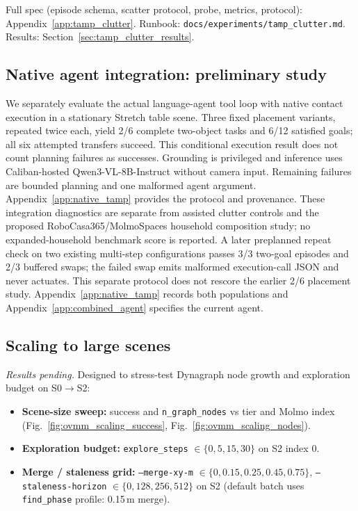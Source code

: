 Full spec (episode schema, scatter protocol, probe, metrics, protocol): Appendix~\ref{app:tamp_clutter}.
Runbook: \texttt{docs/experiments/tamp\_clutter.md}. Results: Section~\ref{sec:tamp_clutter_results}.

\subsection{Native agent integration: preliminary study}
\label{sec:native_agent_preliminary}

We separately evaluate the actual language-agent tool loop with native contact
execution in a stationary Stretch table scene. Three fixed placement variants,
repeated twice each, yield 2/6 complete two-object tasks and 6/12 satisfied goals;
all six attempted transfers succeed. This conditional execution result does not
count planning failures as successes. Grounding is privileged and inference uses
Caliban-hosted Qwen3-VL-8B-Instruct without camera input. Remaining failures are
bounded planning and one malformed agent argument. Appendix~\ref{app:native_tamp}
provides the protocol and provenance. These integration diagnostics are separate
from assisted clutter controls and the proposed RoboCasa365/MolmoSpaces household
composition study; no expanded-household benchmark score is reported.
A later preplanned repeat check on two existing multi-step configurations passes
3/3 two-goal episodes and 2/3 buffered swaps; the failed swap emits malformed
execution-call JSON and never actuates. This separate protocol does not rescore
the earlier 2/6 placement study. Appendix~\ref{app:native_tamp} records both
populations and Appendix~\ref{app:combined_agent} specifies the current agent.

\subsection{Scaling to large scenes}
\label{sec:scaling_large_scenes}

\textit{Results pending.}
Designed to stress-test Dynagraph node growth and exploration budget on S0$\rightarrow$S2:

\begin{itemize}
  \item \textbf{Scene-size sweep:} success and \texttt{n\_graph\_nodes} vs tier and Molmo index (Fig.~\ref{fig:ovmm_scaling_success}, Fig.~\ref{fig:ovmm_scaling_nodes}).
  \item \textbf{Exploration budget:} \texttt{explore\_steps} $\in \{0, 5, 15, 30\}$ on S2 index 0.
  \item \textbf{Merge / staleness grid:} \texttt{--merge-xy-m} $\in \{0, 0.15, 0.25, 0.45, 0.75\}$, \texttt{--staleness-horizon} $\in \{0, 128, 256, 512\}$ on S2 (default batch uses \texttt{find\_phase} profile: 0.15\,m merge).
\end{itemize}

